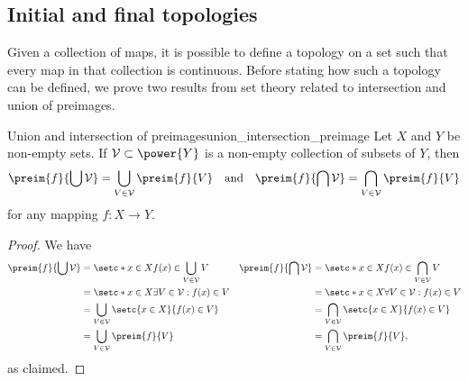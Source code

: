 \subsection{Initial and final topologies}
Given a collection of maps, it is possible to define a topology on a set such that every map in that collection is continuous. Before stating how such a topology can be defined, we prove two results from set theory related to intersection and union of preimages.
\begin{lemma}{Union and intersection of preimages}{union_intersection_preimage}
    Let \(X\) and \(Y\) be non-empty sets. If \(\mathcal{V} \subset \power{Y}\) is a non-empty collection of subsets of \(Y\), then
    \begin{equation*}
        \preim{f}{\bigcup \mathcal{V}} = \bigcup_{V \in \mathcal{V}} \preim{f}{V}
        \quad\text{and}\quad
        \preim{f}{\bigcap \mathcal{V}} = \bigcap_{V \in \mathcal{V}} \preim{f}{V}
    \end{equation*}
    for any mapping \(f : X \to Y\).
\end{lemma}
\begin{proof}
    We have
    \begin{align*}
        \preim{f}{\bigcup \mathcal{V}} &= \setc*{x \in X}{f(x) \in \bigcup_{V \in \mathcal{V}} V}&
        \preim{f}{\bigcap \mathcal{V}} &= \setc*{x \in X}{f(x) \in \bigcap_{V \in \mathcal{V}} V}\\
                                        &= \setc*{x \in X}{\exists V \in \mathcal{V} : f(x) \in V}&
                                        &= \setc*{x \in X}{\forall V \in \mathcal{V} : f(x) \in V}\\
                                        &= \bigcup_{V \in \mathcal{V}} \setc{x \in X}{f(x) \in V}&
                                        &= \bigcap_{V \in \mathcal{V}} \setc{x \in X}{f(x) \in V}\\
                                        &= \bigcup_{V \in \mathcal{V}} \preim{f}{V}&
                                        &= \bigcap_{V \in \mathcal{V}} \preim{f}{V},
    \end{align*}
    as claimed.
\end{proof}

